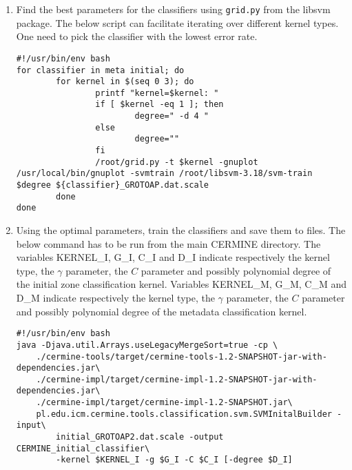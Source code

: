 \begin{appendix}
\begin{enumerate}
\item Find the best parameters for the classifiers using \verb+grid.py+ from the libsvm package. The below script can facilitate iterating over different kernel types. One need to pick the classifier with the lowest error rate.
\begin{lstlisting}
#!/usr/bin/env bash
for classifier in meta initial; do
        for kernel in $(seq 0 3); do
                printf "kernel=$kernel: "
                if [ $kernel -eq 1 ]; then
                        degree=" -d 4 "
                else
                        degree=""
                fi
                /root/grid.py -t $kernel -gnuplot /usr/local/bin/gnuplot -svmtrain /root/libsvm-3.18/svm-train $degree ${classifier}_GROTOAP.dat.scale
        done
done
\end{lstlisting}
\item Using the optimal parameters, train the classifiers and save them to files. The below command has to be run from the main CERMINE directory. The variables KERNEL\_I, G\_I, C\_I and D\_I indicate respectively the kernel type, the $\gamma$ parameter, the $C$ parameter and possibly polynomial degree of the initial zone classification kernel. Variables KERNEL\_M, G\_M, C\_M and D\_M indicate respectively the kernel type, the $\gamma$ parameter, the $C$ parameter and possibly polynomial degree of the metadata classification kernel.
\begin{lstlisting}
#!/usr/bin/env bash
java -Djava.util.Arrays.useLegacyMergeSort=true -cp \
    ./cermine-tools/target/cermine-tools-1.2-SNAPSHOT-jar-with-dependencies.jar\
    ./cermine-impl/target/cermine-impl-1.2-SNAPSHOT-jar-with-dependencies.jar\
    ./cermine-impl/target/cermine-impl-1.2-SNAPSHOT.jar\
    pl.edu.icm.cermine.tools.classification.svm.SVMInitalBuilder -input\
        initial_GROTOAP2.dat.scale -output CERMINE_initial_classifier\
        -kernel $KERNEL_I -g $G_I -C $C_I [-degree $D_I]


\end{lstlisting}
\end{enumerate}
\end{appendix}
